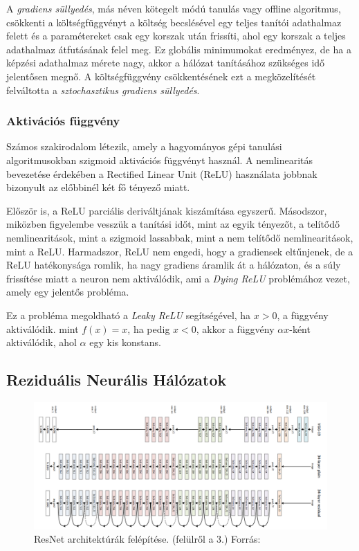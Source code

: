 \documentclass[12pt,a4]{article}
\begin{document}
	A \textit{gradiens süllyedés}, más néven kötegelt módú tanulás vagy offline algoritmus, csökkenti a költségfüggvényt a költség becslésével egy teljes tanítói adathalmaz felett és a paramétereket csak egy korszak után frissíti, ahol egy korszak a teljes adathalmaz átfutásának felel meg.
	Ez globális minimumokat eredményez, de ha a képzési adathalmaz mérete nagy, akkor a hálózat tanításához szükséges idő
	jelentősen megnő. A költségfüggvény csökkentésének ezt a megközelítését felváltotta a \textit{sztochasztikus gradiens süllyedés}.
 
	\subsubsection{Aktivációs függvény}
	
	Számos szakirodalom létezik, amely a hagyományos gépi tanulási algoritmusokban
	szigmoid aktivációs függvényt használ.
	A nemlinearitás bevezetése érdekében a Rectified Linear Unit (ReLU) használata jobbnak bizonyult az előbbinél
	két fő tényező miatt. 
	
	Először is, a ReLU parciális deriváltjának kiszámítása egyszerű. 
	Másodszor, miközben figyelembe vesszük
	a tanítási időt, mint az egyik tényezőt, a telítődő nemlinearitások, mint a szigmoid lassabbak, mint a nem telítődő nemlinearitások, mint a ReLU.
	 Harmadszor, ReLU nem engedi, hogy a gradiensek eltűnjenek, de a ReLU hatékonysága romlik, ha nagy gradiens áramlik át a hálózaton, és a súly frissítése miatt a neuron nem aktiválódik, ami a \textit{Dying ReLU} problémához vezet, amely egy jelentős probléma. 
	 
	 Ez a probléma megoldható a \textit{Leaky ReLU} segítségével, ha $x>0$, a függvény aktiválódik.
	mint $f(x)= x$, ha pedig $x<0$, akkor a függvény $\alpha x$-ként aktiválódik, ahol $\alpha$ egy kis konstans.

    \subsection{Reziduális Neurális Hálózatok}
    
    \begin{figure}[h]	
 		\centering
 		\includegraphics[width=1\linewidth]{ResNet}
 		\caption{ResNet architektúrák felépítése. (felülről a 3.)
 			Forrás:\cite{resnet}}
        \label{fig:resnet}
 	\end{figure}
    
\end{document}
